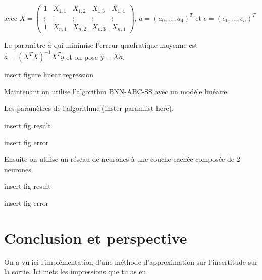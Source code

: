 \documentclass[french,12pt]{article}
\begin{document}
avec $X = \begin{pmatrix} 1 & X_{1, 1} & X_{1, 2} & X_{1, 3} & X_{1, 4}\\
    \vdots & \vdots & \vdots & \vdots & \vdots \\
    1 & X_{n, 1} & X_{n, 2} & X_{n, 3} & X_{n, 4}
\end{pmatrix} $, $a = (a_0,..., a_4)^T$ et $\epsilon = (\epsilon_1,..., \epsilon_n)^T$

Le paramètre $\hat{a}$ qui minimise l'erreur quadratique moyenne est $\hat{a} = (X^T X)^{-1} X^T y$
et on pose $\hat{y} = X \hat{a}$.

insert figure linear regression

Maintenant on utilise l'algorithm BNN-ABC-SS avec un modèle linéaire.

Les paramètres de l'algorithme (inster paramlist here).

insert fig result 

insert fig error

Ensuite on utilise un réseau de neurones à une couche cachée composée de 2 neurones.

insert fig result

insert fig error

\pagebreak
\section{Conclusion et perspective}
On a vu ici l'implémentation d'une méthode d'approximation 
sur l'incertitude sur la sortie. Ici mets les impressions que tu as eu.
\pagebreak


\end{document}
